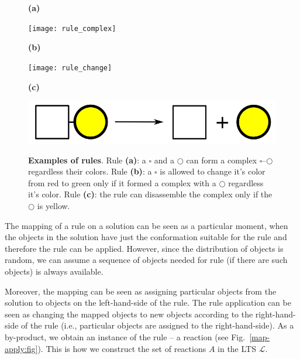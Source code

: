 \documentclass{elsarticle}
\begin{document}
\begin{figure}[!h]
\begin{center}
\begin{minipage}[l]{0.1\textwidth}
    \textbf{(a)}
  \end{minipage}
  \begin{minipage}[r]{0.6\textwidth}
    {\hspace*{0.8cm}\texttt{[image: rule\_complex]}}
\end{minipage}

\begin{minipage}[l]{0.1\textwidth}
    \textbf{(b)}
  \end{minipage}
  \begin{minipage}[r]{0.6\textwidth}
    {\hspace*{1.35cm}\texttt{[image: rule\_change]}}
\end{minipage}

\begin{minipage}[l]{0.1\textwidth}
    \textbf{(c)}
  \end{minipage}
  \begin{minipage}[r]{0.6\textwidth}
    {\hspace*{1.3cm}\includegraphics[scale=0.2]{rule_diss}}
\end{minipage}
\caption{\textbf{Examples of rules}. Rule \textbf{(a)}: a $\square$ and a $\bigcirc$ can form a complex $\square$--$\bigcirc$ regardless their colors. Rule \textbf{(b)}: a $\square$ is allowed to change it's color from red to green only if it formed a complex with a $\bigcirc$ regardless it's color. Rule \textbf{(c)}: the rule can disassemble the complex only if the $\bigcirc$ is yellow.}
\label{rules:fig}
\end{center}
\end{figure}

The mapping of a rule on a solution can be seen as a particular moment, when the objects in the solution have just the conformation suitable for the rule and therefore the rule can be applied. However, since the distribution of objects is random, we can assume a sequence of objects needed for rule (if there are such objects) is always available.

Moreover, the mapping can be seen as assigning particular objects from the solution to objects on the left-hand-side of the rule. The rule application can be seen as changing the mapped objects to new objects according to the right-hand-side of the rule (i.e., particular objects are assigned to the right-hand-side). As a by-product, we obtain an instance of the rule -- a reaction (see Fig.~\ref{map-apply:fig}). This is how we construct the set of reactions $A$ in the LTS $\mathcal{L}$.
\end{document}

